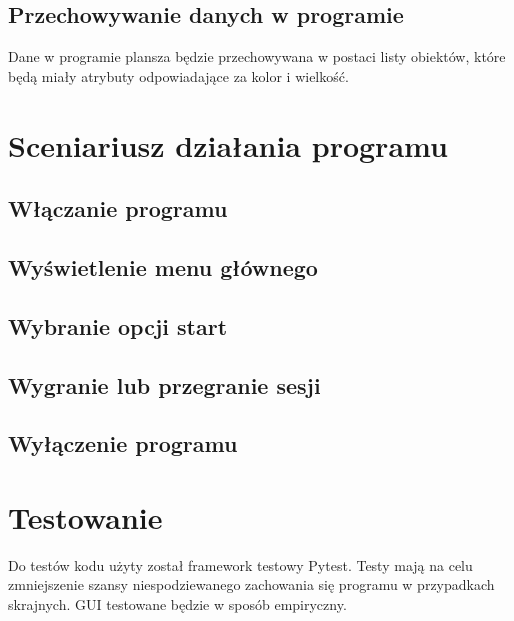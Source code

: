 \documentclass[11pt]{article}
\begin{document}
\subsection{Przechowywanie danych w programie}
Dane w programie plansza będzie przechowywana w postaci listy obiektów, które będą miały atrybuty odpowiadające za kolor i wielkość.
\section{Sceniariusz działania programu}
\subsection{Włączanie programu}
\subsection{Wyświetlenie menu głównego}
\subsection{Wybranie opcji start}
\subsection{Wygranie lub przegranie sesji}
\subsection{Wyłączenie programu}


\section{Testowanie}
Do testów kodu użyty został framework testowy Pytest. Testy mają na celu zmniejszenie szansy niespodziewanego zachowania się programu w przypadkach skrajnych. GUI testowane będzie w sposób empiryczny.
\end{document}
